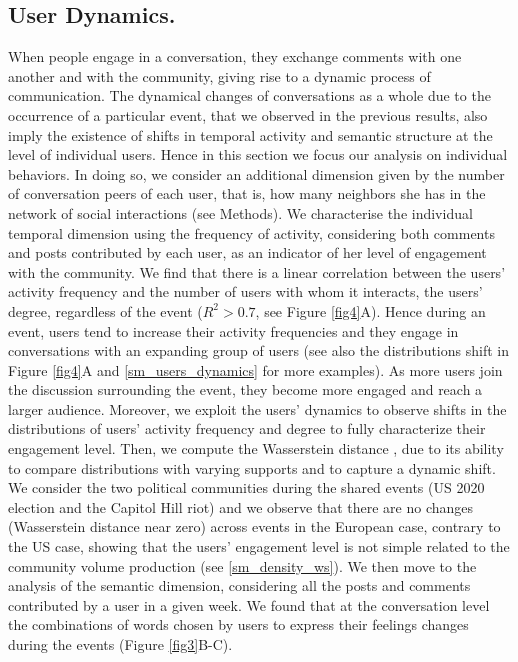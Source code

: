 \documentclass[fleqn,10pt]{wlscirep}
\begin{document}
\subsection*{User Dynamics.}
When people engage in a conversation, they exchange comments with one another and with the community, giving rise to a dynamic process of communication.
The dynamical changes of conversations as a whole due to the occurrence of a particular event, that we observed in the previous results, also imply the existence of shifts in temporal activity and semantic structure at the level of individual users. Hence in this section we focus our analysis on individual behaviors. In doing so, we consider an additional dimension given by the number of conversation peers of each user, that is, how many neighbors she has in the network of social interactions (see Methods).
We characterise the individual temporal dimension using the frequency of activity, considering both comments and posts contributed by each user, as an indicator of her level of engagement with the community.
We find that there is a linear correlation between the users' activity frequency and the number of users with whom it interacts, the users' degree, regardless of the event ($R^2 > 0.7$, see Figure \ref{fig4}A).
Hence during an event, users tend to increase their activity frequencies and they engage in conversations with an expanding group of users (see also the distributions shift in Figure \ref{fig4}A and \ref{sm_users_dynamics} for more examples). 
As more users join the discussion surrounding the event, they become more engaged and reach a larger audience.
Moreover, we exploit the users' dynamics to observe shifts in the distributions of users' activity frequency and degree to fully characterize their engagement level.
Then, we compute the Wasserstein distance \cite{kantorovich1960mathematical}, due to its ability to compare distributions with varying supports and to capture a dynamic shift. 
We consider the two political communities during the shared events (US 2020 election and the Capitol Hill riot) and we observe that there are no changes (Wasserstein distance near zero) across events in the European case, contrary to the US case, showing that the users' engagement level is not simple related to the community volume production (see  \ref{sm_density_ws}).
%
We then move to the analysis of the semantic dimension, considering all the posts and comments contributed by a user in a given week. 
We found that at the conversation level the combinations of words chosen by users to express their feelings changes during the events (Figure \ref{fig3}B-C).
\end{document}
